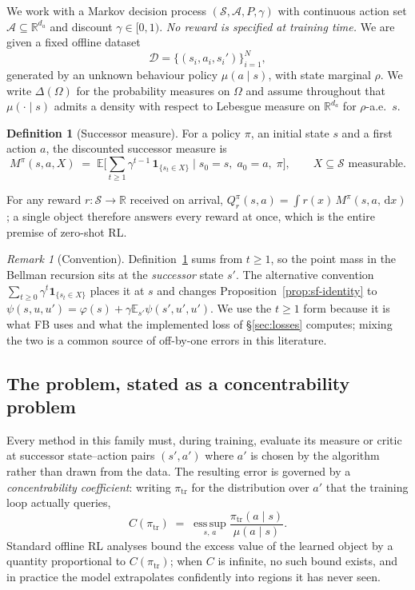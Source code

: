 \documentclass[11pt]{article}
\theoremstyle{plain}
\theoremstyle{definition}
\newtheorem{definition}[lemma]{Definition}
\theoremstyle{remark}
\newtheorem{remark}[lemma]{Remark}
\newcommand{\Sspace}{\mathcal S}
\newcommand{\Aspace}{\mathcal A}
\newcommand{\D}{\mathcal D}
\newcommand{\R}{\mathbb R}
\newcommand{\E}{\mathbb E}
\newcommand{\1}{\mathbf 1}
\newcommand{\dd}{\,\mathrm d}
\newcommand{\Dset}{\Delta}
\begin{document}
We work with a Markov decision process $(\Sspace,\Aspace,P,\gamma)$ with continuous
action set $\Aspace\subseteq\R^{d_a}$ and discount $\gamma\in[0,1)$. \emph{No reward is
specified at training time.} We are given a fixed offline dataset
\[
  \D=\{(s_i,a_i,s_i')\}_{i=1}^N,
\]
generated by an unknown behaviour policy $\mu(a\mid s)$, with state marginal $\rho$. We
write $\Dset(\Omega)$ for the probability measures on $\Omega$ and assume throughout that
$\mu(\cdot\mid s)$ admits a density with respect to Lebesgue measure on $\R^{d_a}$ for
$\rho$-a.e.\ $s$.

\begin{definition}[Successor measure]
\label{def:sm}
For a policy $\pi$, an initial state $s$ and a first action $a$, the discounted
successor measure is
\[
  M^\pi(s,a,X)\;=\;\E\Big[\textstyle\sum_{t\ge 1}\gamma^{t-1}\,\1_{\{s_t\in X\}}
    \;\Big|\; s_0=s,\;a_0=a,\;\pi\Big],
  \qquad X\subseteq\Sspace \text{ measurable}.
\]
\end{definition}

\noindent
For any reward $r:\Sspace\to\R$ received on arrival, $Q^\pi_r(s,a)=\int r(x)\,M^\pi(s,a,\dd x)$;
a single object therefore answers every reward at once, which is the entire premise of
zero-shot RL.

\begin{remark}[Convention]
\label{rem:convention}
Definition~\ref{def:sm} sums from $t\ge 1$, so the point mass in the Bellman recursion sits
at the \emph{successor} state $s'$. The alternative convention
$\sum_{t\ge0}\gamma^t\1_{\{s_t\in X\}}$ places it at $s$ and changes
Proposition~\ref{prop:sf-identity} to $\psi(s,u,u')=\varphi(s)+\gamma\E_{s'}\psi(s',u',u')$.
We use the $t\ge1$ form because it is what FB uses and what the implemented loss of
\S\ref{sec:losses} computes; mixing the two is a common source of off-by-one errors in
this literature.
\end{remark}

\subsection{The problem, stated as a concentrability problem}
\label{sec:problem}

Every method in this family must, during training, evaluate its measure or critic at
successor state--action pairs $(s',a')$ where $a'$ is chosen by the algorithm rather than
drawn from the data. The resulting error is governed by a \emph{concentrability
coefficient}: writing $\pi_{\mathrm{tr}}$ for the distribution over $a'$ that the training
loop actually queries,
\begin{equation}
\label{eq:concentrability}
  C(\pi_{\mathrm{tr}})\;=\;\operatorname*{ess\,sup}_{s,\,a}
     \frac{\pi_{\mathrm{tr}}(a\mid s)}{\mu(a\mid s)} .
\end{equation}
Standard offline RL analyses bound the excess value of the learned object by a quantity
proportional to $C(\pi_{\mathrm{tr}})$; when $C$ is infinite, no such bound exists, and in
practice the model extrapolates confidently into regions it has never seen.
\end{document}

